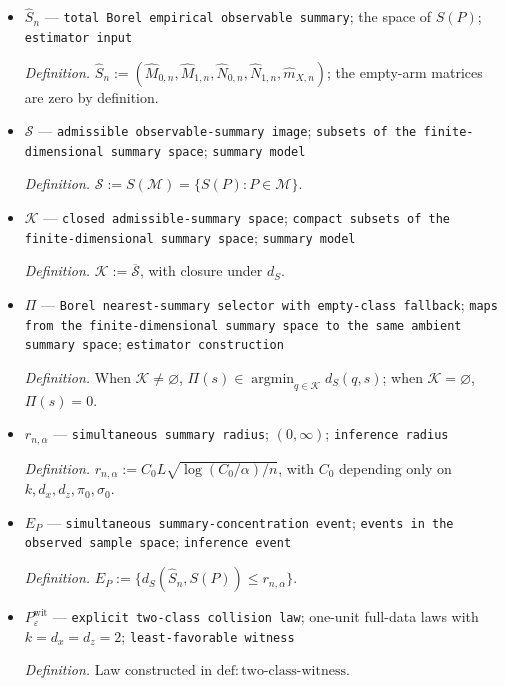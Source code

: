 \documentclass{article}
\begin{document}
\begin{itemize}
  \item \(\widehat S_n\) --- \texttt{total Borel empirical observable summary}; the space of \(S(P)\); \texttt{estimator input}
  \par\smallskip\noindent\emph{Definition.} \(\widehat S_n:=(\widehat M_{0,n},\widehat M_{1,n},\widehat N_{0,n},\widehat N_{1,n},\widehat m_{X,n})\); the empty-arm matrices are zero by definition.
  \item \(\mathscr S\) --- \texttt{admissible observable-\allowbreak{}summary image}; \texttt{subsets of the finite-\allowbreak{}dimensional summary space}; \texttt{summary model}
  \par\smallskip\noindent\emph{Definition.} \(\mathscr S:=S(\mathcal M)=\{S(P):P\in\mathcal M\}\).
  \item \(\mathcal K\) --- \texttt{closed admissible-\allowbreak{}summary space}; \texttt{compact subsets of the finite-\allowbreak{}dimensional summary space}; \texttt{summary model}
  \par\smallskip\noindent\emph{Definition.} \(\mathcal K:=\overline{\mathscr S}\), with closure under \(d_S\).
  \item \(\Pi\) --- \texttt{Borel nearest-\allowbreak{}summary selector with empty-\allowbreak{}class fallback}; \texttt{maps from the finite-\allowbreak{}dimensional summary space to the same ambient summary space}; \texttt{estimator construction}
  \par\smallskip\noindent\emph{Definition.} When \(\mathcal K\ne\varnothing\), \(\Pi(s)\in\operatorname*{argmin}_{q\in\mathcal K}d_S(q,s)\); when \(\mathcal K=\varnothing\), \(\Pi(s)=0\).
  \item \(r_{n,\alpha}\) --- \texttt{simultaneous summary radius}; \((0,\infty)\); \texttt{inference radius}
  \par\smallskip\noindent\emph{Definition.} \(r_{n,\alpha}:=C_0L\sqrt{\log(C_0/\alpha)/n}\), with \(C_0\) depending only on \(k,d_x,d_z,\pi_0,\sigma_0\).
  \item \(E_P\) --- \texttt{simultaneous summary-\allowbreak{}concentration event}; \texttt{events in the observed sample space}; \texttt{inference event}
  \par\smallskip\noindent\emph{Definition.} \(E_P:=\{d_S(\widehat S_n,S(P))\le r_{n,\alpha}\}\).
  \item \(P_{\varepsilon}^{\mathrm{wit}}\) --- \texttt{explicit two-\allowbreak{}class collision law}; one-unit full-data laws with \(k=d_x=d_z=2\); \texttt{least-\allowbreak{}favorable witness}
  \par\smallskip\noindent\emph{Definition.} Law constructed in \(\mathrm{def:two\text{-}class\text{-}witness}\).

\end{itemize}
\end{document}
